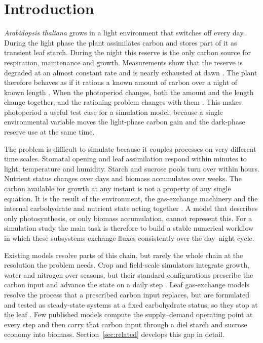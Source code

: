 \section{Introduction}
\label{sec:intro}

\textit{Arabidopsis thaliana} grows in a light environment that switches off
every day. During the light phase the plant assimilates carbon and stores part
of it as transient leaf starch. During the night this reserve is the only carbon
source for respiration, maintenance and growth. Measurements show that the
reserve is degraded at an almost constant rate and is nearly exhausted at dawn
\cite{Graf2010,Smith2007}. The plant therefore behaves as if it rations a known
amount of carbon over a night of known length \cite{Scialdone2013}. When the
photoperiod changes, both the amount and the length change together, and the
rationing problem changes with them \cite{Sulpice2014,Stitt2012}. This makes
photoperiod a useful test case for a simulation model, because a single
environmental variable moves the light-phase carbon gain and the dark-phase
reserve use at the same time.

The problem is difficult to simulate because it couples processes on very
different time scales. Stomatal opening and leaf assimilation respond within
minutes to light, temperature and humidity. Starch and sucrose pools turn over
within hours. Nutrient status changes over days and biomass accumulates over
weeks. The carbon available for growth at any instant is not a property of any
single equation. It is the result of the environment, the gas-exchange
machinery and the internal carbohydrate and nutrient state acting together
\cite{Farquhar1980,ThornleyJohnson1990}. A model that describes only
photosynthesis, or only biomass accumulation, cannot represent this. For a
simulation study the main task is therefore to build a stable numerical
workflow in which these subsystems exchange fluxes consistently over the
day--night cycle.

Existing models resolve parts of this chain, but rarely the whole chain at the
resolution the problem needs. Crop and field-scale simulators integrate growth,
water and nitrogen over seasons, but their standard configurations prescribe the
carbon input and advance the state on a daily step
\cite{deWit2019,Holzworth2014,Jones2003}. Leaf gas-exchange models resolve the
process that a prescribed carbon input replaces, but are formulated and tested as
steady-state systems at a fixed carbohydrate status, so they stop at the leaf
\cite{Farquhar1980,Jarvis1976,Damour2010}. Few published models compute the
supply--demand operating point at every step and then carry that carbon input
through a diel starch and sucrose economy into biomass. Section~\ref{sec:related}
develops this gap in detail.

